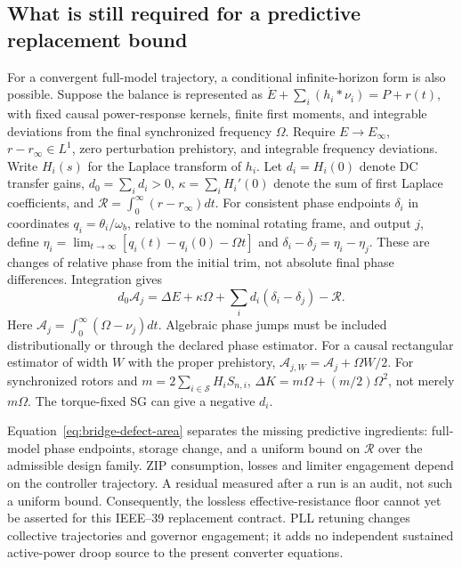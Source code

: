 \documentclass[11pt]{article}
\begin{document}
\subsection{What is still required for a predictive replacement bound}
For a convergent full-model trajectory, a conditional infinite-horizon form
is also possible. Suppose the balance is represented as
$\dot E+\sum_i(h_i*\nu_i)=P+r(t)$, with fixed causal power-response kernels,
finite first moments, and integrable deviations from the final synchronized
frequency $\Omega$. Require $E\to E_\infty$, $r-r_\infty\in L^1$,
zero perturbation prehistory, and integrable frequency deviations.
Write $H_i(s)$ for the Laplace transform of $h_i$.
Let $d_i=H_i(0)$ denote DC transfer gains,
$d_0=\sum_i d_i>0$, $\kappa=\sum_i H_i'(0)$ denote the sum of first Laplace
coefficients, and $\mathcal R=\int_0^\infty(r-r_\infty)dt$.
For consistent phase endpoints $\delta_i$ in coordinates
$q_i=\theta_i/\omega_b$, relative to the nominal rotating frame, and
output $j$, define
$\eta_i=\lim_{t\to\infty}[q_i(t)-q_i(0)-\Omega t]$ and
$\delta_i-\delta_j=\eta_i-\eta_j$. These are changes of relative phase
from the initial trim, not absolute final phase differences. Integration gives
\begin{equation}
 d_0\mathcal A_j=\Delta E+\kappa\Omega
       +\sum_i d_i(\delta_i-\delta_j)-\mathcal R .
 \label{eq:bridge-defect-area}
\end{equation}
Here $\mathcal A_j=\int_0^\infty(\Omega-\nu_j)dt$. Algebraic phase jumps
must be included distributionally or through the declared phase estimator.
For a causal rectangular estimator of width $W$ with the proper prehistory,
$\mathcal A_{j,W}=\mathcal A_j+\Omega W/2$.
For synchronized rotors and $m=2\sum_{i\in\mathcal S}H_iS_{n,i}$,
$\Delta K=m\Omega+(m/2)\Omega^2$, not merely $m\Omega$.
The torque-fixed SG can give a negative $d_i$.

Equation~\eqref{eq:bridge-defect-area} separates the missing predictive
ingredients: full-model phase endpoints, storage change, and a uniform bound
on $\mathcal R$ over the admissible design family. ZIP consumption, losses
and limiter engagement depend on the controller trajectory. A residual
measured after a run is an audit, not such a uniform bound. Consequently,
the lossless effective-resistance floor cannot yet be asserted for this
IEEE--39 replacement contract. PLL retuning changes collective trajectories
and governor engagement; it adds no independent sustained active-power
droop source to the present converter equations.
\end{document}

